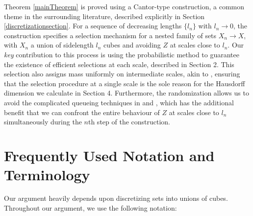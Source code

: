 \documentclass[dvipsnames,letterpaper,12pt]{article}
\numberwithin{equation}{section}
\theoremstyle{plain}
\begin{document}
Theorem \ref{mainTheorem} is proved using a Cantor-type construction, a common theme in the surrounding literature, described explicitly in Section \ref{discretizationsection}. For a sequence of decreasing lengths $\{ l_n \}$ with $l_n \to 0$, the construction specifies a selection mechanism for a nested family of sets $X_n \to X$, with $X_n$ a union of sidelength $l_n$ cubes and avoiding $Z$ at scales close to $l_n$. Our {\it key} contribution to this process is using the probabilistic method to guarantee the existence of efficient selections at each scale, described in Section 2. This selection also assigns mass uniformly on intermediate scales, akin to \cite{MalabikaRob}, ensuring that the selection procedure at a single scale is the sole reason for the Hausdorff dimension we calculate in Section 4. Furthermore, the randomization allows us to avoid the complicated queueing techniques in \cite{KeletiDimOneSet} and \cite{MalabikaRob}, which has the additional benefit that we can confront the entire behaviour of $Z$ at scales close to $l_n$ simultaneously during the $n$th step of the construction.










\section{Frequently Used Notation and Terminology}\label{notationSection}

Our argument heavily depends upon discretizing sets into unions of cubes. Throughout our argument, we use the following notation:

\end{document}
